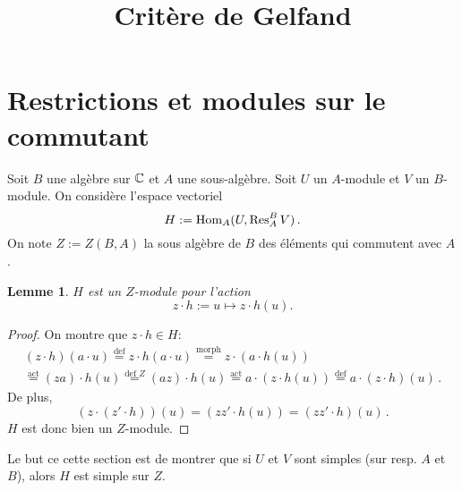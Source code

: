 \documentclass[francais,a4paper,11pt,reqno]{amsart}
\title{Critère de Gelfand}
\theoremstyle{plain}
\newtheorem{LEMME}[THEO]{\bf Lemme}
\theoremstyle{definition}
\theoremstyle{remark}
\newcommand{\act}{\cdot}
\newcommand\eqcom[1]{\mathrel{\overset{\text{#1}}{=}}}
\begin{document}
\maketitle

\section{Restrictions et modules sur le commutant}

Soit $B$ une algèbre sur ${\mathbb C}$ et $A$ une sous-algèbre. Soit $U$ un $A$-module
et $V$ un $B$-module. On considère l'espace vectoriel
\begin{equation}
H := \operatorname{Hom}_A(U, \operatorname{Res}^B_A V)\,.
\end{equation}
On note $Z := Z(B, A)$ la sous algèbre de $B$ des éléments qui commutent avec
$A$.
\begin{LEMME}
  $H$ est un $Z$-module pour l'action
  \begin{equation}
    z\act h := u\mapsto z \act h(u).
  \end{equation}
\end{LEMME}
\begin{proof}
  On montre que $z\act h\in H$:
  \begin{multline}
    (z\act h)(a\act u) \eqcom{def} z\act h(a\act u)
    \eqcom{morph} z\act (a \act h(u)) \\
    \eqcom{act}(za)\act h(u)
    \eqcom{def $Z$}(az)\act h(u)
    \eqcom{act}a\act(z\act h(u))
    \eqcom{def}a\act(z\act h)(u)\,.
  \end{multline}
  De plus,
  \begin{equation}
    (z\act (z'\act h))(u) = (zz'\act h(u)) = (zz'\act h)(u)\,.
  \end{equation}
  $H$ est donc bien un $Z$-module.
\end{proof}
Le but ce cette section est de montrer que si $U$ et $V$ sont simples (sur
resp. $A$ et $B$), alors $H$ est simple sur $Z$.
\end{document}
